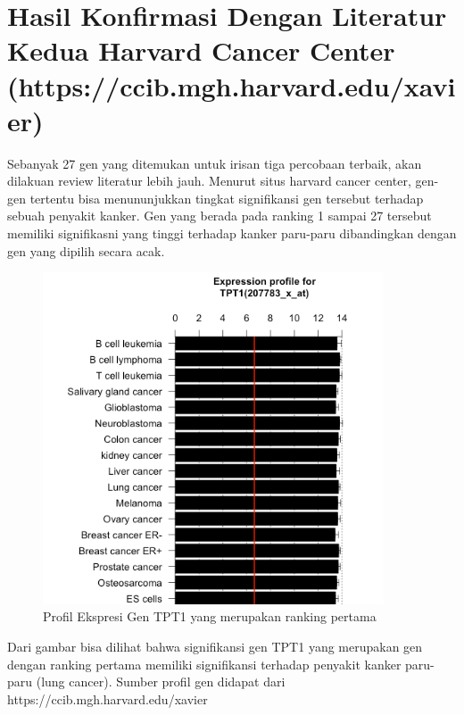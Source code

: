 \section{Hasil Konfirmasi Dengan Literatur Kedua Harvard Cancer Center (https://ccib.mgh.harvard.edu/xavier)}
Sebanyak 27 gen yang ditemukan untuk irisan tiga percobaan terbaik, akan dilakuan review literatur lebih jauh. Menurut situs harvard cancer center, gen-gen tertentu bisa menununjukkan tingkat signifikansi gen tersebut terhadap sebuah penyakit kanker. Gen yang berada pada ranking 1 sampai 27 tersebut memiliki signifikasni yang tinggi terhadap kanker paru-paru dibandingkan dengan gen yang dipilih secara acak.
\begin{figure}
	\centering
	\includegraphics[width=0.9\textwidth]
		{pics/tpt1.png}
	\caption{Profil Ekspresi Gen TPT1 yang merupakan ranking pertama}
	\label{fig:tpt1}
\end{figure}
Dari gambar bisa dilihat bahwa signifikansi gen TPT1 yang merupakan gen dengan ranking pertama memiliki signifikansi terhadap penyakit kanker paru-paru (lung cancer). Sumber profil gen didapat dari https://ccib.mgh.harvard.edu/xavier \\

